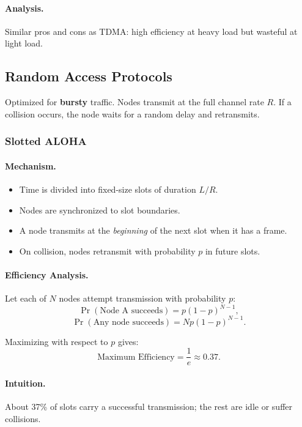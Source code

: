 \documentclass[12pt]{article}
\begin{document}
\paragraph{Analysis.}
Similar pros and cons as TDMA: high efficiency at heavy load but wasteful at light load.

\subsection{Random Access Protocols}

Optimized for \textbf{bursty} traffic. Nodes transmit at the full channel rate $R$.
If a collision occurs, the node waits for a random delay and retransmits.

\subsubsection{Slotted ALOHA}

\paragraph{Mechanism.}
\begin{itemize}
    \item Time is divided into fixed-size slots of duration $L/R$.
    \item Nodes are synchronized to slot boundaries.
    \item A node transmits at the \emph{beginning} of the next slot when it has a frame.
    \item On collision, nodes retransmit with probability $p$ in future slots.
\end{itemize}

\paragraph{Efficiency Analysis.}
Let each of $N$ nodes attempt transmission with probability $p$:
\[
    \Pr(\text{Node A succeeds}) = p(1-p)^{N-1},
\]
\[
    \Pr(\text{Any node succeeds}) = Np(1-p)^{N-1}.
\]

Maximizing with respect to $p$ gives:
\[
    \text{Maximum Efficiency} = \frac{1}{e} \approx 0.37.
\]

\paragraph{Intuition.}
About 37\% of slots carry a successful transmission; the rest are idle or suffer collisions.
\end{document}
